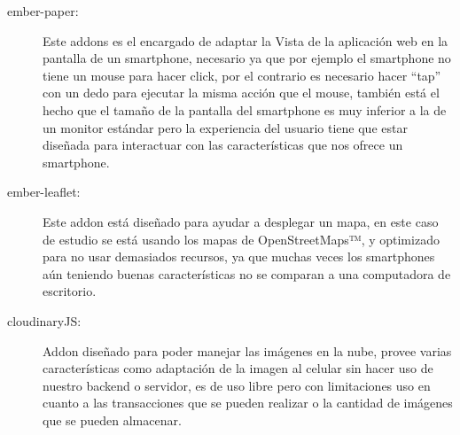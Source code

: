\begin{description}
\item[ember-paper:] Este addons es el encargado de adaptar la Vista de la aplicación web en la pantalla de un smartphone, necesario ya que por ejemplo el smartphone no tiene un mouse para hacer click, por el contrario es necesario hacer “tap” con un dedo para ejecutar la misma acción que el mouse, también está el hecho que el tamaño de la pantalla del smartphone es muy inferior a la de un monitor estándar pero la experiencia del usuario tiene que estar diseñada para interactuar con las características que nos ofrece un smartphone.

\item[ember-leaflet:] Este addon está diseñado para ayudar a desplegar un mapa, en este caso de estudio se está usando los mapas de OpenStreetMaps™, y optimizado para no usar demasiados recursos, ya que muchas veces los smartphones aún teniendo buenas características no se comparan a una computadora de escritorio.

\item[cloudinaryJS:] Addon diseñado para poder manejar las imágenes en la nube, provee varias características como adaptación de la imagen al celular sin hacer uso de nuestro backend o servidor, es de uso libre pero con limitaciones uso en cuanto a las transacciones que se pueden realizar o la cantidad de imágenes que se pueden almacenar.

\end{description}



